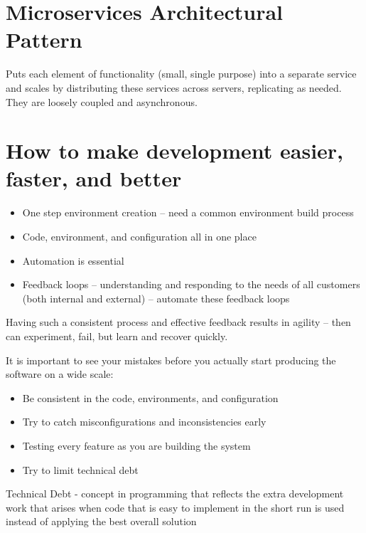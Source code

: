 \documentclass{report}
\begin{document}
\section{Microservices Architectural Pattern}
Puts each element of functionality (small, single purpose) into a separate service and scales by distributing these services across servers, replicating as needed. They are loosely coupled and asynchronous.

\section{How to make development easier, faster, and better}
\begin{itemize}
\item One step environment creation – need a common environment build process
\item Code, environment, and configuration all in one place
\item Automation is essential
\item Feedback loops – understanding and responding to the needs of all customers (both internal and external) – automate these feedback loops
\end{itemize}
Having such a consistent process and effective feedback results in agility – then can experiment, fail, but learn and recover quickly.

It is important to see your mistakes before you actually start producing the software on a wide scale: 
\begin{itemize}
\item Be consistent in the code, environments, and configuration
\item Try to catch misconfigurations and inconsistencies early
\item Testing every feature as you are building the system
\item Try to limit technical debt 
\end{itemize}
Technical Debt - concept in programming that reflects the extra development work that arises when code that is easy to implement in the short run is used instead of applying the best overall solution
\end{document}
